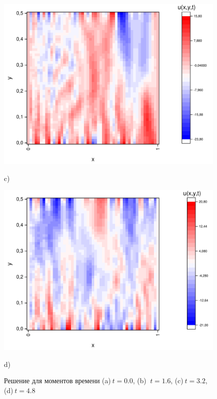 \documentclass[a4paper,12pt]{article}
\begin{document}
\begin{figure}[h!]
\begin{center}
\begin{minipage}[h]{0.23\linewidth}
		\end{minipage}
		\begin{minipage}[h]{0.23\linewidth}
			\includegraphics[width=\textwidth]{graphs/graphs_l/v2/wave_t-16_v2.pdf} \begin{center}	c)	\end{center}
		\end{minipage}
		\begin{minipage}[h]{0.23\linewidth}
			\includegraphics[width=\textwidth]{graphs/graphs_l/v2/wave_t-24_v2.pdf} \begin{center}	d)	\end{center}
		\end{minipage}
	\end{center}
	\caption{Решение для моментов времени (a)$\ t = 0.0$, (b) $\ t = 1.6$, (c)$\ t = 3.2$, (d)$\ t = 4.8$}
\end{figure}
\end{document}
